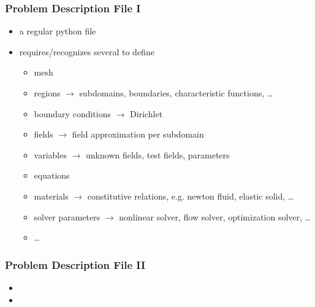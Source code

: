 \documentclass[10pt,t]{beamer}
\newcommand{\red}[1]{{\color{red}{#1}}}
\newcommand{\blue}[1]{{\color{blue}{#1}}}
\newcommand{\lblue}[1]{{\color{lblue}{#1}}}
\begin{document}

\begin{frame}
  \frametitle{Problem Description File I}
  \begin{itemize}
  \item<1-> a regular python file
    \red{$\Rightarrow$ all python machinery is accessible!}
  \item<2-> requires/recognizes several \blue{keywords} to define
    \begin{itemize}
    \item<2-> mesh
    \item<2-> regions $\rightarrow$ subdomains, boundaries, characteristic
      functions, \dots
    \item<2-> boundary conditions $\rightarrow$ Dirichlet
    \item<2-> fields $\rightarrow$ field approximation per subdomain
    \item<2-> variables $\rightarrow$ unknown fields, test fields, parameters
    \item<2-> equations
    \item<2-> materials $\rightarrow$ constitutive relations, e.g. newton
      fluid, elastic solid, \dots
    \item<2-> solver parameters $\rightarrow$ nonlinear solver, flow solver,
      optimization solver, \dots
    \item<2-> \dots
    \end{itemize}
  \end{itemize}
\end{frame}


\begin{frame}
  \frametitle{Problem Description File II}
  \vspace*{-5mm}
  \begin{itemize}
  \item<1-> \blue{mesh} \verbmesh
  \item<1-> \lblue{regions} \verbregions
  \end{itemize}
\end{frame}
\end{document}
